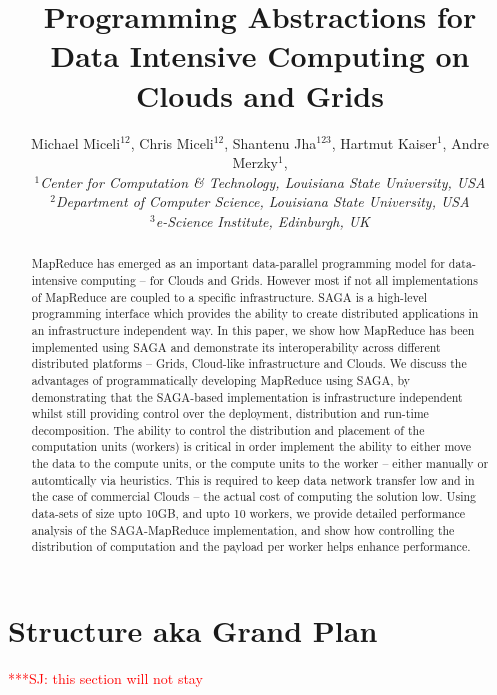 \documentclass[conference,final]{IEEEtran}
\title{Programming Abstractions for Data Intensive Computing on Clouds and Grids}
\author{Michael Miceli$^{12}$, Chris Miceli$^{12}$, Shantenu
  Jha$^{123}$, Hartmut Kaiser$^{1}$, Andre Merzky$^{1}$, \\
  \small{\emph{$^{1}$Center for Computation \& Technology, Louisiana
      State University, USA}}\\
  \small{\emph{$^{2}$Department of Computer Science, Louisiana State
      University, USA}}\\
  \small{\emph{$^{3}$e-Science Institute, Edinburgh, UK}}\\
}
\newcommand{\jhanote}[1]{ {\textcolor{red} { ***SJ: #1 }}}
\newcommand{\jhanote}[1]{}
\begin{document}
\maketitle

\begin{abstract}
  MapReduce has emerged as an important data-parallel programming
  model for data-intensive computing -- for Clouds and Grids. However
  most if not all implementations of MapReduce are coupled to a
  specific infrastructure.  SAGA is a high-level programming interface
  which provides the ability to create distributed applications in an
  infrastructure independent way. In this paper, we show how MapReduce
  has been implemented using SAGA and demonstrate its interoperability
  across different distributed platforms -- Grids, Cloud-like
  infrastructure and Clouds. We discuss the advantages of
  programmatically developing MapReduce using SAGA, by demonstrating
  that the SAGA-based implementation is infrastructure independent
  whilst still providing control over the deployment, distribution and
  run-time decomposition. The ability to control the distribution and
  placement of the computation units (workers) is critical in order
  implement the ability to either move the data to the compute units,
  or the compute units to the worker -- either manually or
  automtically via heuristics. This is required to
  keep data network transfer low and in the case of commercial Clouds
  -- the actual cost of computing the solution low.  Using data-sets
  of size upto 10GB, and upto 10 workers, we provide detailed
  performance analysis of the SAGA-MapReduce implementation, and show
  how controlling the distribution of computation and the payload per
  worker helps enhance performance.

\end{abstract}


\section*{Structure aka Grand Plan}\jhanote{this section will not
  stay}

\end{document}
